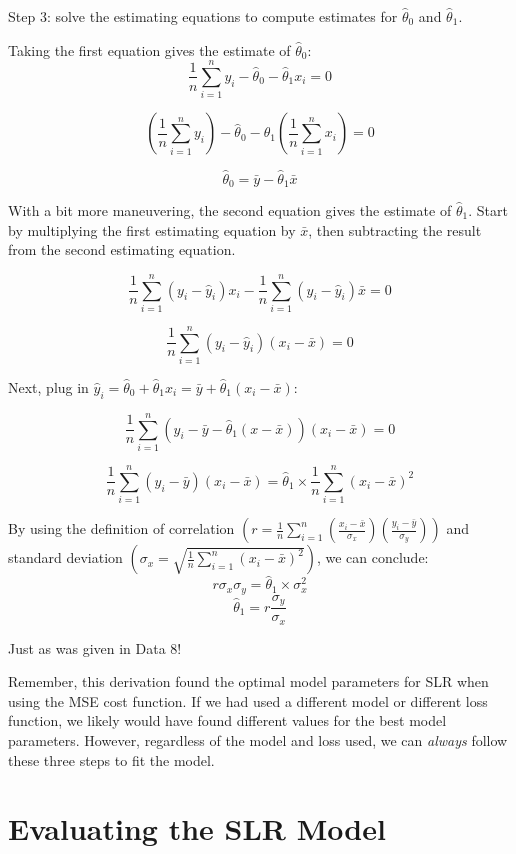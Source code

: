 \documentclass[
  letterpaper,
  DIV=11,
  numbers=noendperiod]{scrreprt}
\begin{document}
Step 3: solve the estimating equations to compute estimates for
\(\hat{\theta}_0\) and \(\hat{\theta}_1\).

Taking the first equation gives the estimate of \(\hat{\theta}_0\):
\[\frac{1}{n} \sum_{i=1}^n y_i - \hat{\theta}_0 - \hat{\theta}_1 x_i = 0 \]

\[\left(\frac{1}{n} \sum_{i=1}^n y_i \right) - \hat{\theta}_0 - \hat{\theta}_1\left(\frac{1}{n} \sum_{i=1}^n x_i \right) = 0\]

\[ \hat{\theta}_0 = \bar{y} - \hat{\theta}_1 \bar{x}\]

With a bit more maneuvering, the second equation gives the estimate of
\(\hat{\theta}_1\). Start by multiplying the first estimating equation
by \(\bar{x}\), then subtracting the result from the second estimating
equation.

\[\frac{1}{n} \sum_{i=1}^n (y_i - \hat{y}_i)x_i - \frac{1}{n} \sum_{i=1}^n (y_i - \hat{y}_i)\bar{x} = 0 \]

\[\frac{1}{n} \sum_{i=1}^n (y_i - \hat{y}_i)(x_i - \bar{x}) = 0 \]

Next, plug in
\(\hat{y}_i = \hat{\theta}_0 + \hat{\theta}_1 x_i = \bar{y} + \hat{\theta}_1(x_i - \bar{x})\):

\[\frac{1}{n} \sum_{i=1}^n (y_i - \bar{y} - \hat{\theta}_1(x - \bar{x}))(x_i - \bar{x}) = 0 \]

\[\frac{1}{n} \sum_{i=1}^n (y_i - \bar{y})(x_i - \bar{x}) = \hat{\theta}_1 \times \frac{1}{n} \sum_{i=1}^n (x_i - \bar{x})^2
\]

By using the definition of correlation
\(\left(r = \frac{1}{n} \sum_{i=1}^n (\frac{x_i-\bar{x}}{\sigma_x})(\frac{y_i-\bar{y}}{\sigma_y}) \right)\)
and standard deviation
\(\left(\sigma_x = \sqrt{\frac{1}{n} \sum_{i=1}^n (x_i - \bar{x})^2} \right)\),
we can conclude:
\[r \sigma_x \sigma_y = \hat{\theta}_1 \times \sigma_x^2\]
\[\hat{\theta}_1 = r \frac{\sigma_y}{\sigma_x}\]

Just as was given in Data 8!

Remember, this derivation found the optimal model parameters for SLR
when using the MSE cost function. If we had used a different model or
different loss function, we likely would have found different values for
the best model parameters. However, regardless of the model and loss
used, we can \emph{always} follow these three steps to fit the model.

\section{Evaluating the SLR Model}\label{evaluating-the-slr-model}
\end{document}
